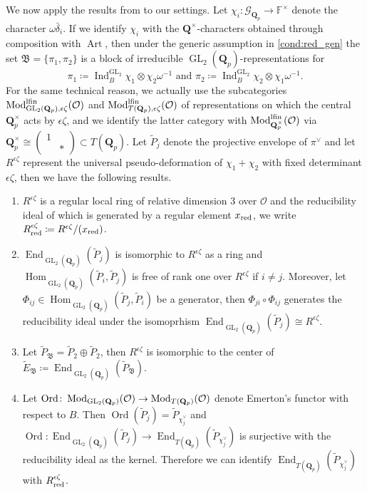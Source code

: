 \documentclass[leqno]{amsart}
\theoremstyle{definition}
\theoremstyle{remark}
\newcommand{\smat}[1]{\left(\begin{smallmatrix} #1 \end{smallmatrix}\right)}
\newcommand{\oo}{\mathcal{O}}
\newcommand{\fF}{\mathbb{F}} %
\newcommand{\Q}{{\mathbf{Q}}}
\newcommand{\Qp}{\mathbf{Q}_p}
\DeclareMathOperator{\End}{End}
\DeclareMathOperator{\Hom}{Hom}
\DeclareMathOperator{\Ind}{Ind}
\DeclareMathOperator{\GL}{GL}
\DeclareMathOperator{\Art}{Art}
\DeclareMathOperator{\Mod}{\textnormal{Mod}}
\DeclareMathOperator{\Ord}{Ord} %
\newcommand{\Gp}{\mathcal{G}_{\Qp}} %
\newcommand{\B}{\mathfrak B} %
\newcommand{\lfin}{\textnormal{lfin}}
\newcommand{\red}{\textnormal{red}}
\newcommand{\xx}{x_\textnormal{red}}
\begin{document}
We now apply the results from \cite[\S 7]{pask}
to our settings.
Let $\chi_i\colon \Gp\to \fF^\times$ 
denote the character $\omega\bar{\delta}_i$.
If we identify $\chi_i$ with the 
$\Q^\times$-characters obtained through composition
with $\Art$,
then under the generic assumption in \eqref{cond:red_gen} the set 
$\B=\{\pi_1,\pi_2\}$ is a block of 
irreducible $\GL_2(\Qp)$-representations for
\[
\pi_1\coloneqq 
\Ind_{B}^{\GL_2}\chi_1\otimes\chi_2\omega^{-1} \text{ and }
\pi_2\coloneqq
\Ind_{B}^{\GL_2}\chi_2\otimes\chi_1\omega^{-1} .
\]
For the same technical reason, we actually use the subcategories
$\Mod^{\lfin}_{\GL_2(\Qp),\epsilon\zeta}(\oo)$ and 
$\Mod^{\lfin}_{T(\Qp),\epsilon\zeta}(\oo)$
of representations on which 
the central $\Qp^\times$ acts by $\epsilon\zeta$,
and we identify the latter category with 
$\Mod^{\lfin}_{\Qp^\times}(\oo)$ via 
$\Qp^\times\cong \smat{1&\\&*}\subset T(\Qp)$.
Let $\tilde{P}_j$ denote the projective envelope of $\pi^\vee$
and let $R^{\epsilon\zeta}$ represent
the universal pseudo-deformation of 
$\chi_1+\chi_2$ with fixed determinant $\epsilon\zeta$,
then we have the following results.
\begin{enumerate}
    \item $R^{\epsilon\zeta}$ is a regular local ring 
    of relative dimension 3 over $\oo$ and the reducibility ideal of which 
    is generated by a regular element $\xx$,
    we write $R^{\epsilon\zeta}_\red\coloneqq R^{\epsilon\zeta}/(\xx)$.
    \item $\End_{\GL_2(\Qp)}(\tilde{P}_j)$ 
    is isomorphic to $R^{\epsilon\zeta}$ as a ring and
    $\Hom_{\GL_2(\Qp)}(\tilde{P}_i,\tilde{P}_j)$ is free of rank one over
    $R^{\epsilon\zeta}$ if $i\neq j$. Moreover, let 
    $\Phi_{ij}\in\Hom_{\GL_2(\Qp)}(\tilde{P}_j, \tilde{P}_i)$
    be a generator, then $\Phi_{ji}\circ\Phi_{ij}$
    generates the reducibility ideal under the isomoprhism
    $\End_{\GL_2(\Qp)}(\tilde{P}_j)\cong R^{\epsilon\zeta}$.
    \item Let $\tilde{P}_\B=
    \tilde{P}_2\oplus \tilde{P}_2$, then $R^{\epsilon\zeta}$ is
    isomorphic to the center of 
    $\tilde{E}_\B\coloneqq
    \End_{\GL_2(\Qp)}(\tilde{P}_\B)$.
    \item Let $\Ord\colon \Mod_{\GL_2(\Qp)}(\oo)\to 
    \Mod_{T(\Qp)}(\oo)$ denote Emerton's functor
    \cite{emeI} with respect to $B$.
    Then $\Ord(\tilde{P}_{j})
    =\tilde{P}_{\chi_j^\vee}$ and 
    $\Ord\colon 
    \End_{\GL_2(\Qp)}(\tilde{P}_j)\to 
    \End_{T(\Qp)}(\tilde{P}_{\chi_j^\vee})$
    is surjective with the reducibility ideal 
    as the kernel. Therefore we can identify 
    $\End_{T(\Qp)}(\tilde{P}_{\chi_j^\vee})$
    with $R^{\epsilon\zeta}_\red$.
\end{enumerate}
\end{document}
